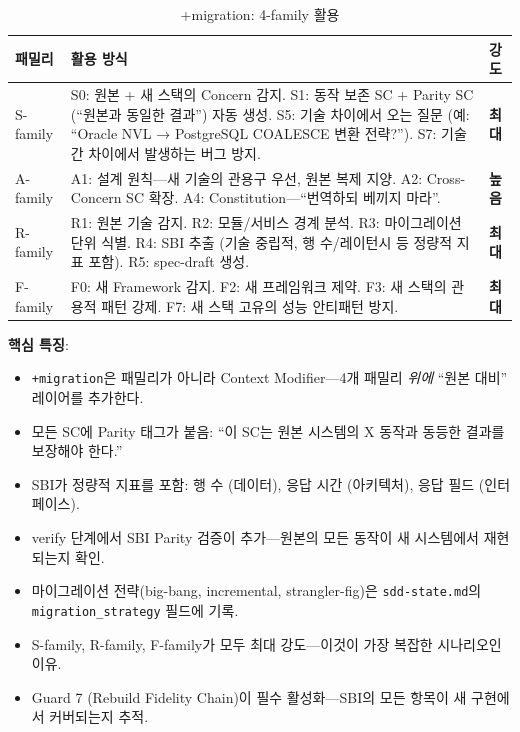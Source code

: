 \documentclass[11pt,a4paper,openright,twoside]{report}
\begin{document}
\begin{table}[H]
\centering
\caption{+migration: 4-family 활용}
\label{tab:ref-migration}
\begin{tabularx}{\textwidth}{lXl}
\toprule
\textbf{패밀리} & \textbf{활용 방식} & \textbf{강도} \\
\midrule
S-family &
  S0: 원본 + 새 스택의 Concern 감지. S1: 동작 보존 SC + Parity SC (``원본과 동일한 결과'') 자동 생성. S5: 기술 차이에서 오는 질문 (예: ``Oracle NVL → PostgreSQL COALESCE 변환 전략?''). S7: 기술 간 차이에서 발생하는 버그 방지. &
  \textbf{최대} \\
\addlinespace
A-family &
  A1: 설계 원칙---새 기술의 관용구 우선, 원본 복제 지양. A2: Cross-Concern SC 확장. A4: Constitution---``번역하되 베끼지 마라''. &
  \textbf{높음} \\
\addlinespace
R-family &
  R1: 원본 기술 감지. R2: 모듈/서비스 경계 분석. R3: 마이그레이션 단위 식별. R4: SBI 추출 (기술 중립적, 행 수/레이턴시 등 정량적 지표 포함). R5: spec-draft 생성. &
  \textbf{최대} \\
\addlinespace
F-family &
  F0: 새 Framework 감지. F2: 새 프레임워크 제약. F3: 새 스택의 관용적 패턴 강제. F7: 새 스택 고유의 성능 안티패턴 방지. &
  \textbf{최대} \\
\bottomrule
\end{tabularx}
\end{table}

\textbf{핵심 특징}:
\begin{itemize}[nosep]
  \item \texttt{+migration}은 패밀리가 아니라 Context Modifier---4개 패밀리 \emph{위에} ``원본 대비'' 레이어를 추가한다.
  \item 모든 SC에 Parity 태그가 붙음: ``이 SC는 원본 시스템의 X 동작과 동등한 결과를 보장해야 한다.''
  \item SBI가 정량적 지표를 포함: 행 수 (데이터), 응답 시간 (아키텍처), 응답 필드 (인터페이스).
  \item verify 단계에서 SBI Parity 검증이 추가---원본의 모든 동작이 새 시스템에서 재현되는지 확인.
  \item 마이그레이션 전략(big-bang, incremental, strangler-fig)은 \texttt{sdd-state.md}의 \texttt{migration\_strategy} 필드에 기록.
  \item S-family, R-family, F-family가 모두 최대 강도---이것이 가장 복잡한 시나리오인 이유.
  \item Guard 7 (Rebuild Fidelity Chain)이 필수 활성화---SBI의 모든 항목이 새 구현에서 커버되는지 추적.
\end{itemize}
\end{document}
